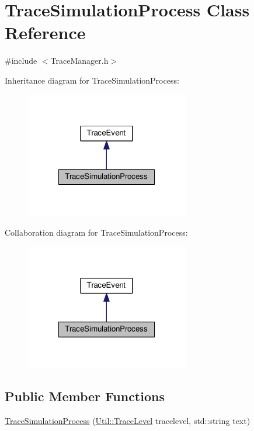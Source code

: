 \hypertarget{class_trace_simulation_process}{\section{Trace\-Simulation\-Process Class Reference}
\label{class_trace_simulation_process}
}


{\ttfamily \#include $<$Trace\-Manager.\-h$>$}



Inheritance diagram for Trace\-Simulation\-Process\-:\nopagebreak
\begin{figure}[H]
\begin{center}
\leavevmode
\includegraphics[width=202pt]{class_trace_simulation_process__inherit__graph}
\end{center}
\end{figure}


Collaboration diagram for Trace\-Simulation\-Process\-:\nopagebreak
\begin{figure}[H]
\begin{center}
\leavevmode
\includegraphics[width=202pt]{class_trace_simulation_process__coll__graph}
\end{center}
\end{figure}
\subsection*{Public Member Functions}
\begin{DoxyCompactItemize}
\item 
\hyperlink{class_trace_simulation_process_a20762e9f477719c87c135896e345f4a6}{Trace\-Simulation\-Process} (\hyperlink{class_util_a0a3482cfa2d915e261c0cf528fdc7afc}{Util\-::\-Trace\-Level} tracelevel, std\-::string text)
\end{DoxyCompactItemize}


